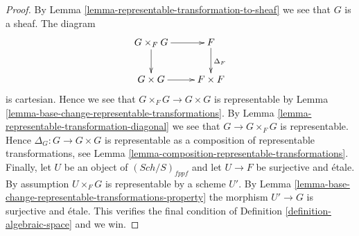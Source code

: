 \documentclass[10pt,a4paper]{amsart}
\theoremstyle{plain}
\theoremstyle{definition}
\theoremstyle{remark}
\numberwithin{equation}{subsection}
\def\Sch{\mathit{Sch}}
\begin{document}
\begin{proof}
By Lemma \ref{lemma-representable-transformation-to-sheaf}
we see that $G$ is a sheaf. The diagram
$$
\xymatrix{
G \times_F G \ar[r] \ar[d] & F \ar[d]^{\Delta_F} \\
G \times G \ar[r] & F \times F
}
$$
is cartesian. Hence we see that $G \times_F G \to G \times G$
is representable by
Lemma \ref{lemma-base-change-representable-transformations}.
By
Lemma \ref{lemma-representable-transformation-diagonal}
we see that $G \to G \times_F G$ is representable.
Hence $\Delta_G : G \to G \times G$ is representable as a composition
of representable transformations, see
Lemma \ref{lemma-composition-representable-transformations}.
Finally, let $U$ be an object of $(\Sch/S)_{fppf}$
and let $U \to F$ be surjective and \'etale. By assumption
$U \times_F G$ is representable by a scheme $U'$. By
Lemma \ref{lemma-base-change-representable-transformations-property}
the morphism $U' \to G$ is surjective and \'etale. This verifies
the final condition of Definition \ref{definition-algebraic-space} and we win.
\end{proof}
\end{document}
